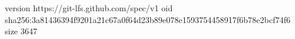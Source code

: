 version https://git-lfs.github.com/spec/v1
oid sha256:3a81436394f9201a21c67a0f64d23b89e078e1593754458917f6b78e2bcf74f6
size 3647
